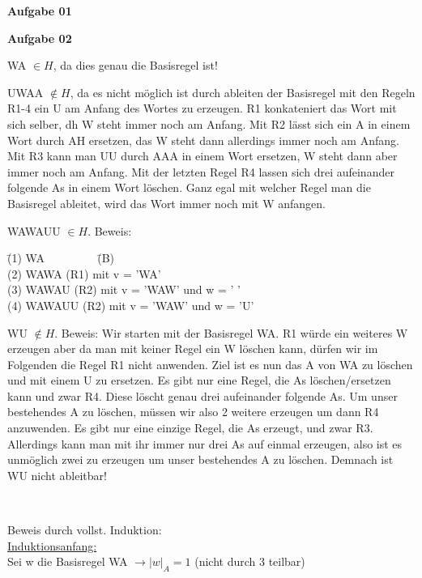\documentclass[a4paper,10pt]{article}
\begin{document}
	\parindent0pt
	\textbf{Aufgabe 01}
	
	\newpage
	\textbf{Aufgabe 02}
	\begin{compactenum} [(a)]
		\item \begin{compactenum} [(i)]
			\item WA $ \in H $, da dies genau die Basisregel ist!
			\item UWAA $ \not\in H$, da es nicht möglich ist durch ableiten der Basisregel mit den Regeln R1-4 ein U am Anfang des Wortes zu erzeugen. R1 konkateniert das Wort mit sich selber, dh W steht immer noch am Anfang. Mit R2 lässt sich ein A in einem Wort durch AH ersetzen, das W steht dann allerdings immer noch am Anfang. Mit R3 kann man UU durch AAA in einem Wort ersetzen, W steht dann aber immer noch am Anfang. Mit der letzten Regel R4 lassen sich drei aufeinander folgende As in einem Wort löschen. Ganz egal mit welcher Regel man die Basisregel ableitet, wird das Wort immer noch mit W anfangen. 
			\item WAWAUU $ \in H $. Beweis:
			\begin{tabbing}
				\=(1) WA $ \qquad \qquad $ \= (B)\\
				\>(2) WAWA \> (R1) mit v = 'WA'\\
				\>(3) WAWAU \> (R2) mit v = 'WAW' und w = ' '\\
				\>(4) WAWAUU \> (R2) mit v = 'WAW' und w = 'U'
			\end{tabbing}
			\item WU $ \not\in H$. Beweis: Wir starten mit der Basisregel WA. R1 würde ein weiteres W erzeugen aber da man mit keiner Regel ein W löschen kann, dürfen wir im Folgenden die Regel R1 nicht anwenden. Ziel ist es nun das A von WA zu löschen und mit einem U zu ersetzen. Es gibt nur eine Regel, die As löschen/ersetzen kann und zwar R4. Diese löscht genau drei aufeinander folgende As. Um unser bestehendes A zu löschen, müssen wir also 2 weitere erzeugen um dann R4 anzuwenden. Es gibt nur eine einzige Regel, die As erzeugt, und zwar R3. Allerdings kann man mit ihr immer nur drei As auf einmal erzeugen, also ist es unmöglich zwei zu erzeugen um unser bestehendes A zu löschen. Demnach ist WU nicht ableitbar!
		\end{compactenum}\
		
		\item Beweis durch vollst. Induktion:\\
		
		\underline{Induktionsanfang:} \\
		Sei w die Basisregel WA $ \rightarrow |w|_A = 1 $ (nicht durch 3 teilbar)\\
		

\end{compactenum}
\end{document}
